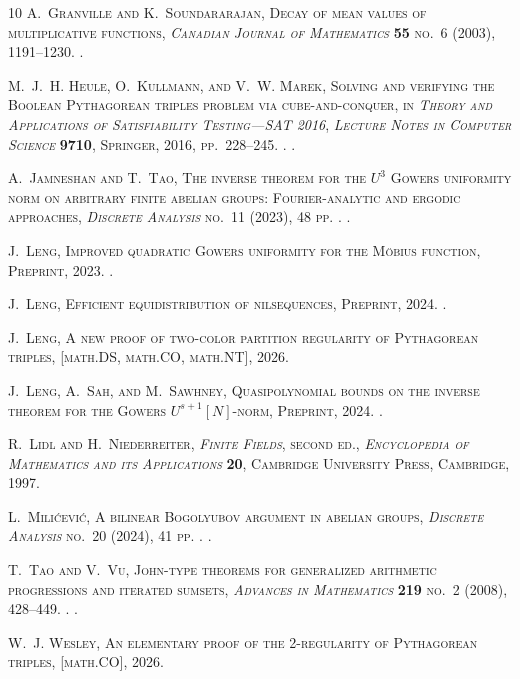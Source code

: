 \documentclass[twoside]{aomart}
\theoremstyle{paperplain}
\theoremstyle{paperdefinition}
\numberwithin{equation}{section}
\begin{document}
\begin{thebibliography}{10}
\bgroup\scshape{}A.~Granville\egroup{} and
  \bgroup\scshape{}K.~Soundararajan\egroup{}, Decay of mean values of
  multiplicative functions,  \emph{Canadian Journal of Mathematics} \textbf{55}
  no.~6 (2003), 1191--1230. .

\bgroup\scshape{}M.~J.~H. Heule\egroup{},
  \bgroup\scshape{}O.~Kullmann\egroup{}, and \bgroup\scshape{}V.~W.
  Marek\egroup{}, Solving and verifying the {B}oolean {P}ythagorean triples
  problem via cube-and-conquer,  in \emph{Theory and Applications of
  Satisfiability Testing---SAT 2016}, \emph{Lecture Notes in Computer Science}
  \textbf{9710}, Springer, 2016, pp.~228--245. .
  .

\bgroup\scshape{}A.~Jamneshan\egroup{} and \bgroup\scshape{}T.~Tao\egroup{},
  The inverse theorem for the {$U^3$} {G}owers uniformity norm on arbitrary
  finite abelian groups: {F}ourier-analytic and ergodic approaches,
  \emph{Discrete Analysis} no.~11 (2023), 48 pp. .
  .

\bgroup\scshape{}J.~Leng\egroup{}, Improved quadratic {G}owers uniformity for
  the {M}{\"o}bius function, Preprint, 2023. .

\bgroup\scshape{}J.~Leng\egroup{}, Efficient equidistribution of nilsequences,
  Preprint, 2024. .

\bgroup\scshape{}J.~Leng\egroup{}, A new proof of two-color partition
  regularity of {P}ythagorean triples,  [math.DS, math.CO, math.NT], 2026.

\bgroup\scshape{}J.~Leng\egroup{}, \bgroup\scshape{}A.~Sah\egroup{}, and
  \bgroup\scshape{}M.~Sawhney\egroup{}, Quasipolynomial bounds on the inverse
  theorem for the {G}owers {$U^{s+1}[N]$}-norm, Preprint, 2024.
  .

\bgroup\scshape{}R.~Lidl\egroup{} and
  \bgroup\scshape{}H.~Niederreiter\egroup{}, \emph{Finite Fields}, second ed.,
  \emph{Encyclopedia of Mathematics and its Applications} \textbf{20},
  Cambridge University Press, Cambridge, 1997.

\bgroup\scshape{}L.~Mili{\'c}evi{\'c}\egroup{}, A bilinear {Bogolyubov}
  argument in abelian groups,  \emph{Discrete Analysis} no.~20 (2024), 41 pp.
  .  .

\bgroup\scshape{}T.~Tao\egroup{} and \bgroup\scshape{}V.~Vu\egroup{},
  John-type theorems for generalized arithmetic progressions and iterated
  sumsets, \emph{Advances in Mathematics} \textbf{219} no.~2 (2008),
  428--449. . .

\enlargethispage{7\baselineskip}
\bgroup\scshape{}W.~J. Wesley\egroup{}, An elementary proof of the
  2-regularity of {P}ythagorean triples,  [math.CO], 2026.

\end{thebibliography}
\end{document}
